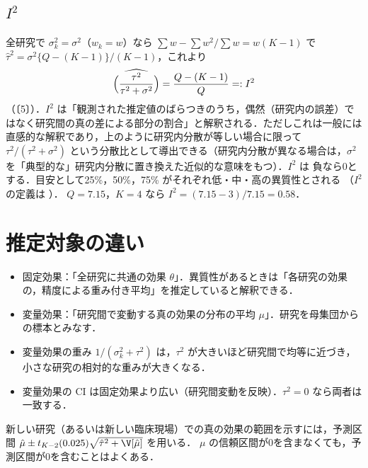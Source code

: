 \subsection{\texorpdfstring{$I^2$}{I²}}\label{subsec:15-i2}
全研究で $\sigma_k^2=\sigma^2$（$w_k=w$）なら $\sum w-\sum w^2/\sum w=w(K-1)$ で $\hat\tau^2=\sigma^2\{Q-(K-1)\}/(K-1)$，これより
\begin{equation}
\widehat{\Bigl(\frac{\tau^2}{\tau^2+\sigma^2}\Bigr)}=\frac{Q-(K-1)}{Q}=:I^2\label{eq:15-i2}
\end{equation}
（〔5〕）．$I^2$ は「観測された推定値のばらつきのうち，偶然（研究内の誤差）ではなく研究間の真の差による部分の割合」と解釈される．ただしこれは一般には直感的な解釈であり，上のように研究内分散が等しい場合に限って $\tau^2/(\tau^2+\sigma^2)$ という分散比として導出できる（研究内分散が異なる場合は，$\sigma^2$ を「典型的な」研究内分散に置き換えた近似的な意味をもつ）．$I^2$ は
負なら0とする．目安として25\%，50\%，75\% がそれぞれ低・中・高の異質性とされる \cite{higgins2003}（$I^2$ の定義は \cite{higgins2002}）．
$Q=7.15$，$K=4$ なら $I^2=(7.15-3)/7.15=0.58$．

\section{推定対象の違い}\label{sec:15-target}
\begin{itemize}
\item 固定効果：「全研究に共通の効果 $\theta$」．異質性があるときは「各研究の効果の，精度による重み付き平均」を推定していると解釈できる．
\item 変量効果：「研究間で変動する真の効果の分布の平均 $\mu$」．研究を母集団からの標本とみなす．
\item 変量効果の重み $1/(\sigma_k^2+\tau^2)$ は，$\tau^2$ が大きいほど研究間で均等に近づき，小さな研究の相対的な重みが大きくなる．
\item 変量効果の CI は固定効果より広い（研究間変動を反映）．$\tau^2=0$ なら両者は一致する．
\end{itemize}
\begin{supbox}
新しい研究（あるいは新しい臨床現場）での真の効果の範囲を示すには，予測区間 $\hat\mu\pm t_{K-2}(0.025)\sqrt{\hat\tau^2+\V[\hat\mu]}$ を用いる．
$\mu$ の信頼区間が0を含まなくても，予測区間が0を含むことはよくある．
\end{supbox}

